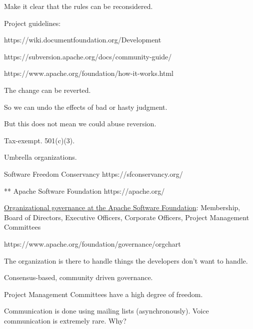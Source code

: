 \documentclass[landscape,30pt]{foils}
\begin{document}
Make it clear that the rules can be reconsidered.

Project guidelines:

https://wiki.documentfoundation.org/Development

https://subversion.apache.org/docs/community-guide/

https://www.apache.org/foundation/how-it-works.html





The change can be reverted.

So we can undo the effects of bad or hasty judgment.

But this does not mean we could abuse reversion.



Tax-exempt.  501(c)(3).

Umbrella organizations.

Software Freedom Conservancy https://sfconservancy.org/

** Apache Software Foundation https://apache.org/

\underline{Organizational governance at the Apache Software Foundation}: Membership, Board of Directors, Executive Officers, Corporate Officers, Project Management Committees

https://www.apache.org/foundation/governance/orgchart




The organization is there to handle things the developers don't want to handle.


Consensus-based, community driven governance.

Project Management Committees have a high degree of freedom.

Communication is done using mailing lists (asynchronously).  Voice communication is extremely rare.  Why?
\end{document}
